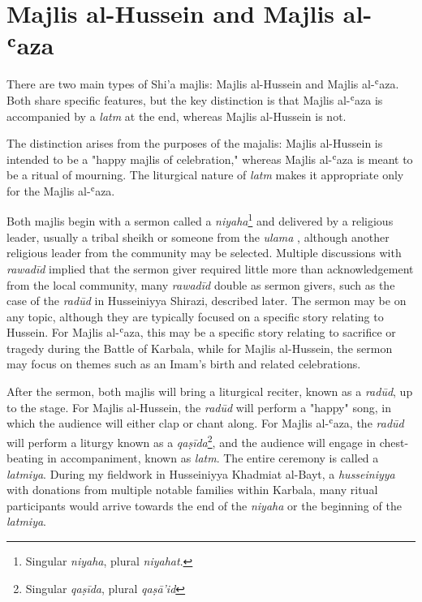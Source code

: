 \section{Majlis al-Hussein and Majlis al-ʿaza}
There are two main types of Shi'a majlis: Majlis al-Hussein and Majlis al-ʿaza. Both share specific features, but the key distinction is that Majlis al-ʿaza is accompanied by a \emph{latm} at the end, whereas Majlis al-Hussein is not.

The distinction arises from the purposes of the majalis: Majlis al-Hussein is intended to be a "happy majlis of celebration," \cite{al-husseini_interview_2022} whereas Majlis al-ʿaza is meant to be a ritual of mourning. The liturgical nature of \emph{latm} makes it appropriate only for the Majlis al-ʿaza.

Both majlis begin with a sermon called a \emph{niyaha}\footnote{Singular \emph{niyaha}, plural \emph{niyahat}.} and delivered by a religious leader, usually a tribal sheikh or someone from the \emph{ulama} \cite{hamdan_development_2012}, although another religious leader from the community may be selected. Multiple discussions with \emph{rawadīd} implied that the sermon giver required little more than acknowledgement from the local community, many \emph{rawadīd} double as sermon givers, such as the case of the \emph{radūd} in Husseiniyya Shirazi, described later. The sermon may be on any topic, although they are typically focused on a specific story relating to Hussein. For Majlis al-ʿaza, this may be a specific story relating to sacrifice or tragedy during the Battle of Karbala, while for Majlis al-Hussein, the sermon may focus on themes such as an Imam's birth and related celebrations.

After the sermon, both majlis will bring a liturgical reciter, known as a \emph{radūd}, up to the stage. For Majlis al-Hussein, the \emph{radūd} will perform a "happy" song, in which the audience will either clap or chant along. For Majlis al-ʿaza, the \emph{radūd} will perform a liturgy known as a \emph{qaṣīda}\footnote{Singular \emph{qaṣīda}, plural \emph{qaṣā’id}}, and the audience will engage in chest-beating in accompaniment, known as \emph{latm}. The entire ceremony is called a \emph{latmiya}. During my fieldwork in Husseiniyya Khadmiat al-Bayt, a \emph{husseiniyya} with donations from multiple notable families within Karbala, many ritual participants would arrive towards the end of the \emph{niyaha} or the beginning of the \emph{latmiya}.

